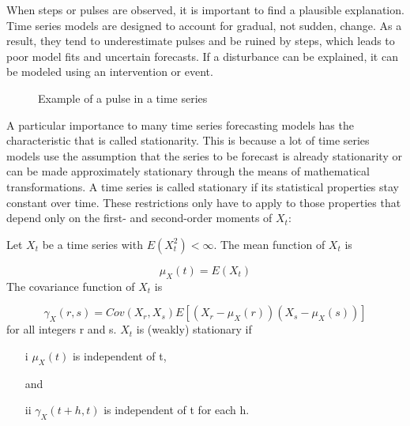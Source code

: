 When steps or pulses are observed, it is important to find a plausible explanation. Time series models are designed to account for gradual, not sudden, change. As a result, they tend to underestimate pulses and be ruined by steps, which leads to poor model fits and uncertain forecasts. If a disturbance can be explained, it can be modeled using an intervention or event. 

\begin{figure}[ht]
	\centering
	\caption{Example of a pulse in a time series}
\end{figure}


A particular importance to many time series forecasting models has the characteristic that is called stationarity. This is because a lot of time series models use the assumption that the series to be forecast is already stationarity or can be made approximately stationary through the means of mathematical transformations. 
A time series is called stationary if its statistical properties stay constant over time. These restrictions only have to apply to those properties that depend only on the first- and second-order moments of \(X_t\):

Let \({X_t}\) be a time series with \(E(X_t^2 ) < \infty\). The mean function of \({X_t }\) is

\begin{equation}\label{eq:mean_function}
\mu_X(t) = E(X_t )
\end{equation}
The covariance function of \({X_t }\) is

\begin{equation}\label{eq:covariance_function}
\gamma_X(r, s)  = Cov(X_r,X_s)  E[(X_r - \mu_X(r))(X_s - \mu_X(s))]
\end{equation}
for all integers r and s.
\({X_t }\) is (weakly) stationary if
\begin{enumerate}
	\item [i] \(\mu_X(t)\) is independent of t,
	\item [and]
	\item [ii] \(\gamma_X(t + h, t) \) is independent of t for each h.
\end{enumerate}

